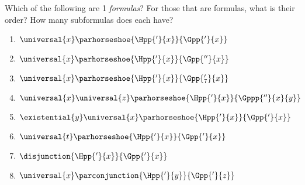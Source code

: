  Which of the following are \GQL{}1 \emph{formulas}? 
For those that are formulas, what is their order? 
How many subformulas does each have?
\begin{multicols}{2}
\begin{enumerate}
\item {$\universal{\variable{x}}\parhorseshoe{\Hpp{'}{\variable{x}}}{\Gpp{'}{\variable{x}}}$}
\item {$\universal{\variable{x}}\parhorseshoe{\Hpp{'}{\variable{x}}}{\Gpp{''}{\variable{x}}}$}
\item {$\universal{\variable{x}}\parhorseshoe{\Hpp{'}{\variable{x}}}{\Gpp{'_7}{\variable{x}}}$}
\item {$\universal{\variable{x}}\universal{\variable{z}}\parhorseshoe{\Hpp{'}{\variable{x}}}{\Gppp{''}{\variable{x}}{\variable{y}}}$}
\item {$\existential{\variable{y}}\universal{\variable{x}}\parhorseshoe{\Hpp{'}{\variable{x}}}{\Gpp{'}{\variable{x}}}$}
\item {$\universal{\variable{t}}\parhorseshoe{\Hpp{'}{\variable{x}}}{\Gpp{'}{\variable{x}}}$}
\item {$\disjunction{\Hpp{'}{\variable{x}}}{\Gpp{'}{\variable{x}}}$}
\item {$\universal{\variable{x}}\parconjunction{\Hpp{'}{\variable{y}}}{\Gpp{'}{\variable{z}}}$}
\end{enumerate}
\end{multicols}


